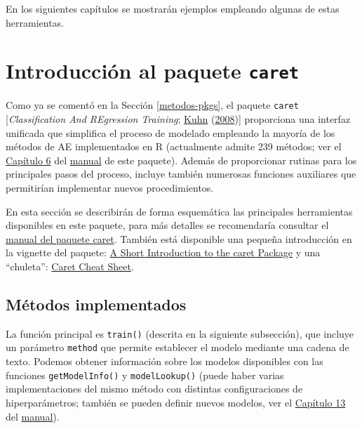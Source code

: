 \documentclass[
  spanish,
]{book}
\theoremstyle{break}
\theoremstyle{definition}
\theoremstyle{definition}
\theoremstyle{definition}
\theoremstyle{definition}
\theoremstyle{remark}
\begin{document}
En los siguientes capítulos se mostrarán ejemplos empleando algunas de estas herramientas.

\hypertarget{caret}{%
\section{\texorpdfstring{Introducción al paquete \texttt{caret}}{Introducción al paquete caret}}\label{caret}}

Como ya se comentó en la Sección \ref{metodos-pkgs}, el paquete \texttt{caret} {[}\emph{Classification And REgression Training}; \protect\hyperlink{ref-kuhn2008building}{Kuhn} (\protect\hyperlink{ref-kuhn2008building}{2008}){]} proporciona una interfaz unificada que simplifica el proceso de modelado empleando la mayoría de los métodos de AE implementados en R (actualmente admite 239 métodos; ver el \href{https://topepo.github.io/caret/available-models.html}{Capítulo 6} del \href{https://topepo.github.io/caret}{manual} de este paquete).
Además de proporcionar rutinas para los principales pasos del proceso, incluye también numerosas funciones auxiliares que permitirían implementar nuevos procedimientos.

En esta sección se describirán de forma esquemática las principales herramientas disponibles en este paquete, para más detalles se recomendaría consultar el \href{https://topepo.github.io/caret}{manual del paquete caret}.
También está disponible una pequeña introducción en la vignette del paquete: \href{https://cran.r-project.org/web/packages/caret/vignettes/caret.html}{A Short Introduction to the caret Package} y una ``chuleta'': \href{https://raw.githubusercontent.com/rstudio/cheatsheets/master/caret.pdf}{Caret Cheat Sheet}.

\hypertarget{muxe9todos-implementados}{%
\subsection{Métodos implementados}\label{muxe9todos-implementados}}

La función principal es \texttt{train()} (descrita en la siguiente subsección), que incluye un parámetro \texttt{method} que permite establecer el modelo mediante una cadena de texto.
Podemos obtener información sobre los modelos disponibles con las funciones \texttt{getModelInfo()} y \texttt{modelLookup()} (puede haber varias implementaciones del mismo método con distintas configuraciones de hiperparámetros; también se pueden definir nuevos modelos, ver el \href{https://topepo.github.io/caret/using-your-own-model-in-train.html}{Capítulo 13} del \href{https://topepo.github.io/caret}{manual}).
\end{document}

